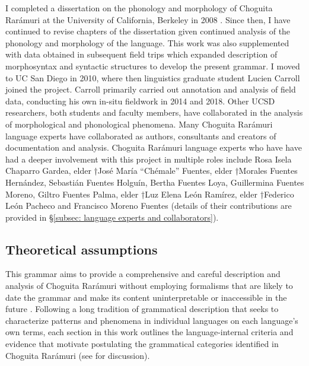 I completed a dissertation on the phonology and morphology of Choguita Rarámuri at the University of California, Berkeley in 2008 \citep{caballero2008choguita}. Since then, I have continued to revise chapters of the dissertation given continued analysis of the phonology and morphology of the language. This work was also supplemented with data obtained in subsequent field trips which expanded description of morphosyntax and syntactic structures to develop the present grammar. I moved to UC San Diego in 2010, where then linguistics graduate student Lucien Carroll joined the project. Carroll primarily carried out annotation and analysis of field data, conducting his own in-situ fieldwork in 2014 and 2018. Other UCSD researchers, both students and faculty members, have collaborated in the analysis of morphological and phonological phenomena. Many Choguita Rarámuri language experts have collaborated as authors, consultants and creators of documentation and analysis. Choguita Rarámuri language experts who have have had a deeper involvement with this project in multiple roles include Rosa Isela Chaparro Gardea, elder †José María “Chémale” Fuentes, elder †Morales Fuentes Hernández, Sebastián Fuentes Holguín, Bertha Fuentes Loya, Guillermina Fuentes Moreno, Giltro Fuentes Palma, elder †Luz Elena León Ramírez, elder †Federico León Pacheco and Francisco Moreno Fuentes (details of their contributions are provided in §\ref{subsec: language experts and collaborators}).


\subsection{Theoretical assumptions}
\label{subsec: theoretical assumptions}

This grammar aims to provide a comprehensive and careful description and analysis of Choguita Rarámuri without employing formalisms that are likely to date the grammar and make its content uninterpretable or inaccessible in the future \citep{ameka2006catching}. Following a long tradition of grammatical description that seeks to characterize patterns and phenomena in individual languages on each language's own terms, each section in this work outlines the language-internal criteria and evidence that motivate postulating the grammatical categories identified in Choguita Rarámuri (see \citealt{cristofaro2008organization} for discussion).

